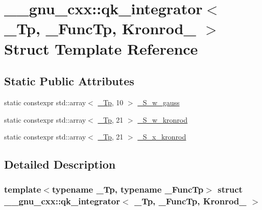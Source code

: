 \hypertarget{struct____gnu__cxx_1_1qk__integrator_3_01__Tp_00_01__FuncTp_00_01Kronrod__41_01_4}{}\section{\+\_\+\+\_\+gnu\+\_\+cxx\+:\+:qk\+\_\+integrator$<$ \+\_\+\+Tp, \+\_\+\+Func\+Tp, Kronrod\+\_ $>$ Struct Template Reference}
\label{struct____gnu__cxx_1_1qk__integrator_3_01__Tp_00_01__FuncTp_00_01Kronrod__41_01_4}
\subsection*{Static Public Attributes}
\begin{DoxyCompactItemize}
\item 
static constexpr std\+::array$<$ \hyperlink{namespace____gnu__cxx_a3b19a9c800ca194374ef9172290f7d79}{\+\_\+\+Tp}, 10 $>$ \hyperlink{struct____gnu__cxx_1_1qk__integrator_3_01__Tp_00_01__FuncTp_00_01Kronrod__41_01_4_a8fe39fcd7f3d302de90f987b349bc7a6}{\+\_\+\+S\+\_\+w\+\_\+gauss}
\item 
static constexpr std\+::array$<$ \hyperlink{namespace____gnu__cxx_a3b19a9c800ca194374ef9172290f7d79}{\+\_\+\+Tp}, 21 $>$ \hyperlink{struct____gnu__cxx_1_1qk__integrator_3_01__Tp_00_01__FuncTp_00_01Kronrod__41_01_4_a0ca7d785bcc4ea62564da850f4349aa2}{\+\_\+\+S\+\_\+w\+\_\+kronrod}
\item 
static constexpr std\+::array$<$ \hyperlink{namespace____gnu__cxx_a3b19a9c800ca194374ef9172290f7d79}{\+\_\+\+Tp}, 21 $>$ \hyperlink{struct____gnu__cxx_1_1qk__integrator_3_01__Tp_00_01__FuncTp_00_01Kronrod__41_01_4_a0002dac8d27b1ce360e5c2adf88fa916}{\+\_\+\+S\+\_\+x\+\_\+kronrod}
\end{DoxyCompactItemize}


\subsection{Detailed Description}
\subsubsection*{template$<$typename \+\_\+\+Tp, typename \+\_\+\+Func\+Tp$>$\newline
struct \+\_\+\+\_\+gnu\+\_\+cxx\+::qk\+\_\+integrator$<$ \+\_\+\+Tp, \+\_\+\+Func\+Tp, Kronrod\+\_ $>$}

